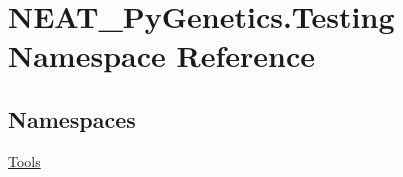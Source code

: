 \hypertarget{namespaceNEAT__PyGenetics_1_1Testing}{}\section{N\+E\+A\+T\+\_\+\+Py\+Genetics.\+Testing Namespace Reference}
\label{namespaceNEAT__PyGenetics_1_1Testing}
\subsection*{Namespaces}
\begin{DoxyCompactItemize}
\item 
 \hyperlink{namespaceNEAT__PyGenetics_1_1Testing_1_1Tools}{Tools}
\end{DoxyCompactItemize}
